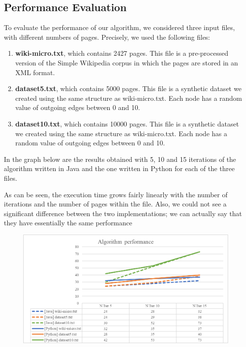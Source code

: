 \subsection{Performance Evaluation}
To evaluate the performance of our algorithm, we considered three input files, with different numbers of pages. Precisely, we used the following files:

\begin{enumerate}
	\item \textbf{wiki-micro.txt}, which contains 2427 pages. This file is a pre-processed version of the Simple Wikipedia corpus in which the pages are stored in an XML format.
	\item \textbf{dataset5.txt}, which contains 5000 pages. This file is a synthetic dataset we created using the same structure as wiki-micro.txt. Each node has a random value of outgoing edges between 0 and 10.
	\item \textbf{dataset10.txt}, which contains 10000 pages. This file is a synthetic dataset we created using the same structure as wiki-micro.txt. Each node has a random value of outgoing edges between 0 and 10.
\end{enumerate}

In the graph below are the results obtained with 5, 10 and 15 iterations of the algorithm written in Java and the one written in Python for each of the three files.


\noindent As can be seen, the execution time grows fairly linearly with the number of iterations and the number of pages within the file. Also, we could not see a significant difference between the two implementations; we can actually say that they have essentially the same performance

\begin{figure}[H]
	\includegraphics[width=\textwidth]{img/result.png}
	\label{fig:result}     
\end{figure}
